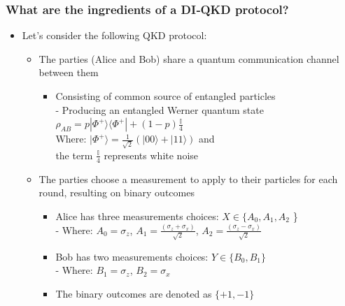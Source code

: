 \documentclass{beamer}
\begin{document}
		\begin{frame}
			\frametitle{\large What are the ingredients of a DI‑QKD protocol?}

            \vspace{3ex}
            \begin{itemize}
                \item Let's consider the following QKD protocol:
                \begin{itemize}
                    \item The parties (Alice and Bob) share a quantum communication channel between them
                    \begin{itemize}
                        \item Consisting of common source of entangled particles\\
                        - Producing an entangled Werner quantum state\\\hspace{0.5em}${\rho}_{AB} = p|{\Phi}^{+}\rangle\langle{\Phi}^{+}| + (1 - p) \frac{\mathbb{I}}{4}$\\
                        \vspace{0.75ex}\hspace{0.5em}Where: $|{\Phi}^{+}\rangle = \frac{1}{\sqrt{2}}(|00\rangle + |11\rangle)$ and\\\hspace{3.75em}the term $\frac{\mathbb{I}}{4}$ represents white noise 
                    \end{itemize}
                    \vspace{1.5ex}
                    \item The parties choose a measurement to apply to their particles for each round, resulting on binary outcomes
                    \begin{itemize}
                        \item Alice has three measurements choices: $X \in \{ {A}_{0}, {A}_{1}, {A}_{2}$ \}\\
                        - Where: ${A}_{0} = {\sigma}_{z}$, ${A}_{1} = \frac{({\sigma}_{z} + {\sigma}_{x})}{\sqrt{2}}$, ${A}_{2} = \frac{({\sigma}_{z} - {\sigma}_{x})}{\sqrt{2}}$
                        \item Bob has two measurements choices: $Y \in \{ {B}_{0}, {B}_{1} \}$\\
                        - Where: ${B}_{1} = {\sigma}_{z}$, ${B}_{2} = {\sigma}_{x}$
                        \item The binary outcomes are denoted as $\{+1 ,-1\}$
                    \end{itemize}
                \end{itemize}
            \end{itemize}
		\end{frame}
\end{document}
